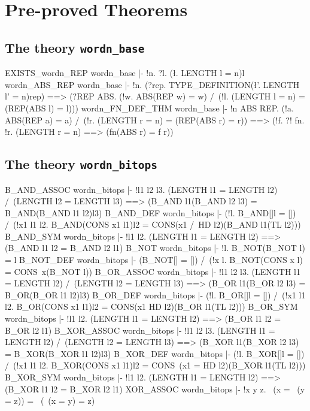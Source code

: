 \chapter{Pre-proved Theorems}

\section{The theory {\tt wordn\_base}}
\THEOREM EXISTS\_wordn\_REP wordn\_base
|- !n. ?l. (\l. LENGTH l = n)l
\ENDTHEOREM
\THEOREM wordn\_ABS\_REP wordn\_base
|- !n.
    (?rep. TYPE_DEFINITION(\l'. LENGTH l' = n)rep) ==>
    (?REP ABS.
      (!w. ABS(REP w) = w) /\ (!l. (LENGTH l = n) = (REP(ABS l) = l)))
\ENDTHEOREM
\THEOREM wordn\_FN\_DEF\_THM wordn\_base
|- !n ABS REP.
    (!a. ABS(REP a) = a) /\ (!r. (LENGTH r = n) = (REP(ABS r) = r)) ==>
    (!f. ?! fn. !r. (LENGTH r = n) ==> (fn(ABS r) = f r))
\ENDTHEOREM
\section{The theory {\tt wordn\_bitops}}
\THEOREM B\_AND\_ASSOC wordn\_bitops
|- !l1 l2 l3.
    (LENGTH l1 = LENGTH l2) /\ (LENGTH l2 = LENGTH l3) ==>
    (B_AND l1(B_AND l2 l3) = B_AND(B_AND l1 l2)l3)
\ENDTHEOREM
\THEOREM B\_AND\_DEF wordn\_bitops
|- (!l. B_AND[]l = []) /\
   (!x1 l1 l2. B_AND(CONS x1 l1)l2 = CONS(x1 /\ HD l2)(B_AND l1(TL l2)))
\ENDTHEOREM
\THEOREM B\_AND\_SYM wordn\_bitops
|- !l1 l2. (LENGTH l1 = LENGTH l2) ==> (B_AND l1 l2 = B_AND l2 l1)
\ENDTHEOREM
\THEOREM B\_NOT wordn\_bitops
|- !l. B_NOT(B_NOT l) = l
\ENDTHEOREM
\THEOREM B\_NOT\_DEF wordn\_bitops
|- (B_NOT[] = []) /\ (!x l. B_NOT(CONS x l) = CONS~x(B_NOT l))
\ENDTHEOREM
\THEOREM B\_OR\_ASSOC wordn\_bitops
|- !l1 l2 l3.
    (LENGTH l1 = LENGTH l2) /\ (LENGTH l2 = LENGTH l3) ==>
    (B_OR l1(B_OR l2 l3) = B_OR(B_OR l1 l2)l3)
\ENDTHEOREM
\THEOREM B\_OR\_DEF wordn\_bitops
|- (!l. B_OR[]l = []) /\
   (!x1 l1 l2. B_OR(CONS x1 l1)l2 = CONS(x1 \/ HD l2)(B_OR l1(TL l2)))
\ENDTHEOREM
\THEOREM B\_OR\_SYM wordn\_bitops
|- !l1 l2. (LENGTH l1 = LENGTH l2) ==> (B_OR l1 l2 = B_OR l2 l1)
\ENDTHEOREM
\THEOREM B\_XOR\_ASSOC wordn\_bitops
|- !l1 l2 l3.
    (LENGTH l1 = LENGTH l2) /\ (LENGTH l2 = LENGTH l3) ==>
    (B_XOR l1(B_XOR l2 l3) = B_XOR(B_XOR l1 l2)l3)
\ENDTHEOREM
\THEOREM B\_XOR\_DEF wordn\_bitops
|- (!l. B_XOR[]l = []) /\
   (!x1 l1 l2. B_XOR(CONS x1 l1)l2 = CONS~(x1 = HD l2)(B_XOR l1(TL l2)))
\ENDTHEOREM
\THEOREM B\_XOR\_SYM wordn\_bitops
|- !l1 l2. (LENGTH l1 = LENGTH l2) ==> (B_XOR l1 l2 = B_XOR l2 l1)
\ENDTHEOREM
\THEOREM XOR\_ASSOC wordn\_bitops
|- !x y z. ~(x = ~(y = z)) = ~(~(x = y) = z)
\ENDTHEOREM
